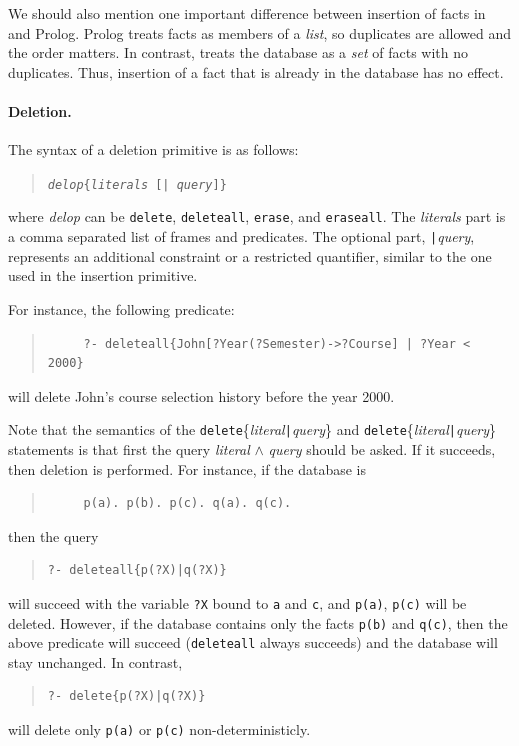 \documentclass[11pt]{article}
\newcommand{\ERGO}{\mbox{\smaller{\ensuremath{\cal{E}}\smaller{{\sc{RGO}}}}}\xspace}
\newcommand{\FLSYSTEM}{\ERGO}
\begin{document}
We should also mention one important difference between insertion of facts
in \FLSYSTEM and Prolog. Prolog treats facts as members of a \emph{list}, so
duplicates are allowed and the order matters. In contrast, \FLSYSTEM treats
the database as a \emph{set} of facts with no duplicates. Thus, insertion
of a fact that is already in the database has no effect.


%
\paragraph{Deletion.} The syntax of a deletion primitive is as follows:
\begin{quote}
{\tt \emph{delop}\{\emph{literals} [| \emph{query}]\}}
\end{quote}
where {\it delop} can be {\tt delete}, {\tt deleteall}, {\tt erase}, and
{\tt eraseall}. The {\it literals} part is a comma separated list of
frames and predicates. The optional part, {\tt |}\emph{query},
represents an additional constraint or a restricted quantifier, similar
to the one used in the insertion primitive.

For instance, the following predicate:
\begin{quote}
\begin{verbatim}
     ?- deleteall{John[?Year(?Semester)->?Course] | ?Year < 2000}
\end{verbatim}
\end{quote}
will delete John's course selection history before the year 2000.

Note that the semantics of the {\tt delete}\{\emph{literal}{\tt |}{\it query}\}
and {\tt delete}\{\emph{literal}{\tt |}{\it query}\}
statements is that first the query \emph{literal} $\wedge$ \emph{query} should
be asked. If it succeeds, then deletion is performed. For instance, if the
database is
\begin{quote}
\begin{verbatim}
     p(a). p(b). p(c). q(a). q(c).
\end{verbatim}
\end{quote}
then the query
\begin{quote}
\begin{verbatim}
?- deleteall{p(?X)|q(?X)}
\end{verbatim}
\end{quote}
will succeed with the variable {\tt ?X} bound to {\tt a} and {\tt c}, and
{\tt p(a)}, {\tt p(c)} will be deleted.  However, if the database contains
only the facts {\tt p(b)} and {\tt q(c)}, then the above predicate will
succeed ({\tt deleteall} always succeeds) and the database will stay
unchanged. In contrast,
\begin{quote}
\begin{verbatim}
?- delete{p(?X)|q(?X)}
\end{verbatim}
\end{quote}
will delete only \texttt{p(a)} or \texttt{p(c)} non-deterministicly.  
\end{document}
